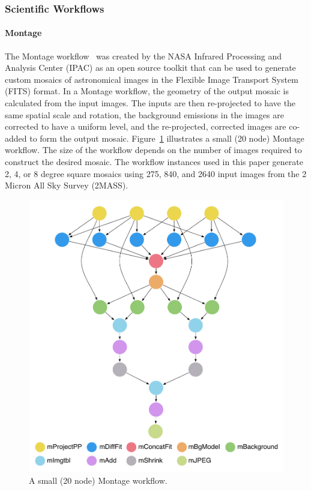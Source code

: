 \documentclass[final,5p,times,twocolumn]{elsarticle}
\begin{document}
\subsubsection{Scientific Workflows}

\paragraph{\textbf{Montage}}
The Montage workflow~\cite{Montage} was created by the NASA Infrared Processing and Analysis
Center (IPAC) as an open source toolkit that can be used to generate custom mosaics of
astronomical images in the Flexible Image Transport System (FITS) format. In a Montage workflow,
the geometry of the output mosaic is calculated from the 
input images. The inputs are then re-projected to have the same spatial scale and rotation, 
the background emissions in the images are corrected to have a uniform level, and the 
re-projected, corrected images are co-added to form the output mosaic.
Figure~\ref{fig:workflow-montage} illustrates a small (20 node) Montage workflow. 
The size of the workflow depends on the number of images required to construct the 
desired mosaic. The workflow instances used in this paper generate 2, 4, or 8 degree square
mosaics using 275, 840, and 2640 input images from the 2 Micron All Sky Survey (2MASS).

\begin{figure}[!htt]
	\centering
	\includegraphics[width=0.9\linewidth]{figures/workflow-montage}
	\caption{A small (20 node) Montage workflow.}
	\label{fig:workflow-montage}
\end{figure}
\end{document}
